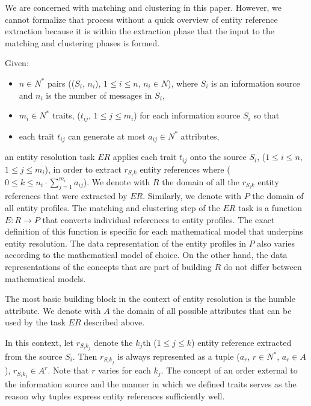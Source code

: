 \documentclass[11pt]{article}
\begin{document}
    We are concerned with matching and clustering in this paper.
    However, we cannot formalize that process without a quick overview of entity
    reference extraction because it is within the extraction phase that the
    input to the matching and clustering phases is formed.

    Given:
    \begin{itemize}
        \item $n \in N^*$ pairs (($S_i$, $n_i$), $1 \leq i \leq n$, $n_i \in N$), 
        where $S_i$ is an information source and $n_i$ is the number of messages
        in $S_i$,
        \item $m_i \in N^*$ traits, ($t_{ij}$, $1 \leq j \leq m_i$) for each
        information source $S_i$ so that
        \item each trait $t_{ij}$ can generate at most $a_{ij} \in N^*$
        attributes,
    \end{itemize}
    an entity resolution task $ER$ applies each trait $t_{ij}$ onto the source
    $S_i$, ($1 \leq i \leq n$, $1 \leq j \leq m_i$), in order to extract
    $r_{{S_i}k}$ entity references where
    ($0 \leq k \leq n_i \cdot \sum^{m_i}_{j=1}a_{ij}$).
    We denote with $R$ the domain of all the $r_{{S_i}k}$ entity references that
    were extracted by $ER$.
    Similarly, we denote with $P$ the domain of all entity profiles.
    The matching and clustering step of the $ER$ task is a function
    $E: R \rightarrow P$ that converts individual references to entity profiles.
    The exact definition of this function is specific for each mathematical
    model that underpins entity resolution.
    The data representation of the entity profiles in $P$ also varies according
    to the mathematical model of choice.
    On the other hand, the data representations of the concepts that are part of
    building $R$ do not differ between mathematical models.

    The most basic building block in the context of entity resolution is the
    humble attribute.
    We denote with $A$ the domain of all possible attributes that can be used by
    the task $ER$ described above.

    In this context, let $r_{{S_i}{k_j}}$ denote the $k_j$th ($1 \leq j \leq k$)
    entity reference extracted from the source $S_i$.
    Then $r_{{S_i}{k_j}}$ is always represented as a tuple
    ($a_r$, $r \in N^*$, $a_r \in A$), $r_{{S_i}{k_j}} \in A^r$.
    Note that $r$ varies for each $k_j$.
    The concept of an order external to the information source and the manner in
    which we defined traits serves as the reason why tuples express entity
    references sufficiently well.
\end{document}

